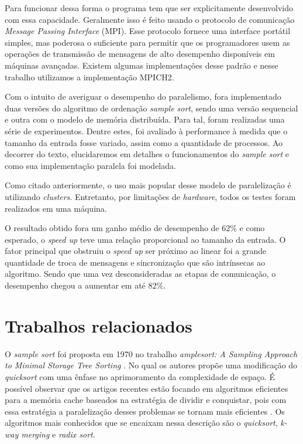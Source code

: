 \documentclass[letterpaper, 10 pt, conference]{ieeeconf}  %
\begin{document}
Para funcionar dessa forma o programa tem que ser explicitamente desenvolvido com essa capacidade. Geralmente isso é feito usando o protocolo de comunicação \textit{Message Passing Interface} (MPI). Esse protocolo fornece uma interface portátil simples, mas poderosa o suficiente para permitir que os programadores usem as operações de transmissão de mensagens de alto desempenho disponíveis em máquinas avançadas. Existem algumas implementações desse padrão e nesse trabalho utilizamos a implementação MPICH2.

Com o intuito de averiguar o desempenho do paralelismo, fora implementado duas versões do algoritmo de ordenação \textit{sample sort}, sendo uma versão sequencial e outra com o modelo de memória distribuída. Para tal, foram realizadas uma série de experimentos. Dentre estes, foi avaliado à performance à medida que o tamanho da entrada fosse variado, assim como a quantidade de processos. Ao decorrer do texto, elucidaremos em detalhes o funcionamentos do \textit{sample sort} e  como sua implementação paralela foi modelada.

Como citado anteriormente, o uso mais popular desse modelo de paralelização é utilizando \textit{clusters}. Entretanto, por limitações de \textit{hardware}, todos os testes foram realizados em uma máquina.

O resultado obtido fora um ganho médio de desempenho de $62\%$ e como esperado, o \textit{speed up} teve uma relação proporcional ao tamanho da entrada. O fator principal que obstruiu o \textit{speed up} ser próximo ao linear foi a grande quantidade de troca de mensagens e sincronização que são intrínsecas ao algoritmo. Sendo que uma vez desconsideradas as etapas de comunicação, o desempenho chegou a aumentar em até $82\%$.



\section{Trabalhos relacionados}
O \textit{sample sort} foi proposta em 1970 no trabalho \textit{amplesort: A Sampling Approach to Minimal Storage Tree Sorting} \cite{c11}. No qual os autores propõe uma modificação do \textit{quicksort} com uma ênfase no aprimoramento da complexidade de espaço. É possível observar que os artigos recentes estão focando em algoritmos eficientes para a memória cache baseados na estratégia de dividir e conquistar, pois com essa estratégia a paralelização desses problemas se tornam mais eficientes \cite{c2}. Os algoritmos mais conhecidos que se encaixam nessa descrição são o \textit{quicksort}, \textit{k-way merging} e \textit{radix sort}. 
\end{document}
